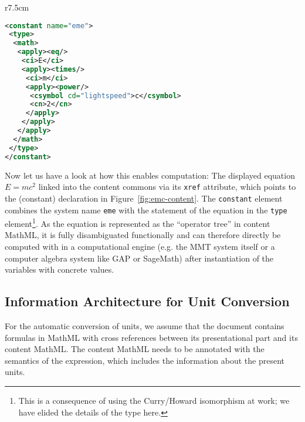 \begin{wrapfigure}r{7.5cm}\vspace*{-1em}
\begin{lstlisting}[language=XML,morekeywords={constant,type,apply,math,ci,cn,csymbol},basicstyle=\footnotesize\sf]
<constant name="eme">
 <type>
  <math>
   <apply><eq/>
    <ci>E</ci>
    <apply><times/>
     <ci>m</ci>
     <apply><power/>
      <csymbol cd="lightspeed">c</csymbol>
      <cn>2</cn>
     </apply>
    </apply>
   </apply>
  </math>     
 </type>
</constant>
\end{lstlisting}
\caption{$E=mc^2$ in Content MathML}\label{fig:emc-content}\vspace*{-2em}
\end{wrapfigure}
Now let us have a look at how this enables computation: The displayed equation $E=mc^2$
linked into the content commons via its \lstinline|xref| attribute, which points to the
(constant) declaration in Figure~\ref{fig:emc-content}. The \lstinline|constant| element
combines the system name \lstinline|eme| with the statement of the equation in the
\lstinline|type| element\footnote{This is a consequence of using the Curry/Howard
  isomorphism at work; we have elided the details of the type here.}. As the equation is
represented as the ``operator tree'' in content MathML, it is fully disambiguated
functionally and can therefore directly be computed with in a computational engine
(e.g. the MMT system itself or a computer algebra system like GAP or SageMath) after
instantiation of the variables with concrete values.


\subsection{Information Architecture for Unit Conversion}
For the automatic conversion of units, we assume that the document contains formulas
in MathML with cross references between its presentational part and its content MathML. 
The content MathML needs to be annotated with the semantics of the expression, which
includes the information about the present units. 



